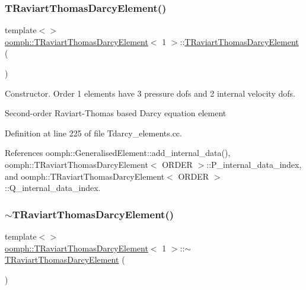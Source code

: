 \subsubsection{\texorpdfstring{T\+Raviart\+Thomas\+Darcy\+Element()}{TRaviartThomasDarcyElement()}\hspace{0.1cm}{\footnotesize\ttfamily [3/3]}}
{\footnotesize\ttfamily template$<$$>$ \\
\hyperlink{classoomph_1_1TRaviartThomasDarcyElement}{oomph\+::\+T\+Raviart\+Thomas\+Darcy\+Element}$<$ 1 $>$\+::\hyperlink{classoomph_1_1TRaviartThomasDarcyElement}{T\+Raviart\+Thomas\+Darcy\+Element} (\begin{DoxyParamCaption}{ }\end{DoxyParamCaption})}



Constructor. Order 1 elements have 3 pressure dofs and 2 internal velocity dofs. 

Second-\/order Raviart-\/\+Thomas based Darcy equation element 

Definition at line 225 of file Tdarcy\+\_\+elements.\+cc.



References oomph\+::\+Generalised\+Element\+::add\+\_\+internal\+\_\+data(), oomph\+::\+T\+Raviart\+Thomas\+Darcy\+Element$<$ O\+R\+D\+E\+R $>$\+::\+P\+\_\+internal\+\_\+data\+\_\+index, and oomph\+::\+T\+Raviart\+Thomas\+Darcy\+Element$<$ O\+R\+D\+E\+R $>$\+::\+Q\+\_\+internal\+\_\+data\+\_\+index.

\mbox{\label{classoomph_1_1TRaviartThomasDarcyElement_ab36f29154094df22944c535f9d556495}} 
\subsubsection{\texorpdfstring{$\sim$\+T\+Raviart\+Thomas\+Darcy\+Element()}{~TRaviartThomasDarcyElement()}\hspace{0.1cm}{\footnotesize\ttfamily [3/3]}}
{\footnotesize\ttfamily template$<$$>$ \\
\hyperlink{classoomph_1_1TRaviartThomasDarcyElement}{oomph\+::\+T\+Raviart\+Thomas\+Darcy\+Element}$<$ 1 $>$\+::$\sim$\hyperlink{classoomph_1_1TRaviartThomasDarcyElement}{T\+Raviart\+Thomas\+Darcy\+Element} (\begin{DoxyParamCaption}{ }\end{DoxyParamCaption})}



